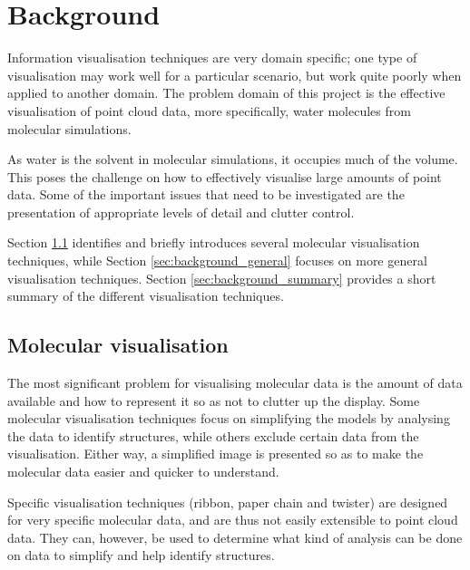 \graphicspath{{./background/}}

\chapter{Background}
\label{cha:background}


Information visualisation techniques are very domain specific; one type of
visualisation may work well for a particular scenario, but work quite poorly
when applied to another domain. The problem domain of this project is the
effective visualisation of point cloud data, more specifically, water molecules
from molecular simulations.

As water is the solvent in molecular simulations, it occupies much of the
volume. This poses the challenge on how to effectively visualise large amounts
of point data. Some of the important issues that need to be investigated are
the presentation of appropriate levels of detail and clutter control.

Section \ref{sec:background_molecular} identifies and briefly introduces
several molecular visualisation techniques, while Section
\ref{sec:background_general} focuses on more general visualisation techniques.
Section \ref{sec:background_summary} provides a short summary of the different
visualisation techniques.


\section{Molecular visualisation}
\label{sec:background_molecular}


The most significant problem for visualising molecular data is the amount of
data available and how to represent it so as not to clutter up the display.
Some molecular visualisation techniques focus on simplifying the models by
analysing the data to identify structures, while others exclude certain data
from the visualisation. Either way, a simplified image is presented so as to
make the molecular data easier and quicker to understand.

Specific visualisation techniques (ribbon, paper chain and twister) are
designed for very specific molecular data, and are thus not easily extensible
to point cloud data. They can, however, be used to determine what kind of
analysis can be done on data to simplify and help identify structures.

